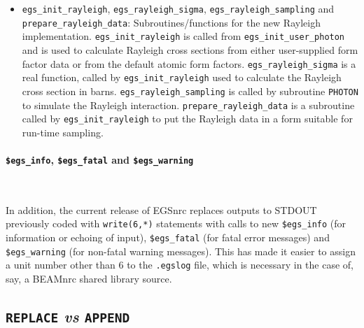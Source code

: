 \begin{itemize}
\item 
{}
{\tt egs\_init\_rayleigh}, {\tt egs\_rayleigh\_sigma},
{\tt egs\_rayleigh\_sampling} and {\tt prepare\_rayleigh\_data}:
Subroutines/functions for the new Rayleigh implementation. 
{\tt egs\_init\_rayleigh} is called from {\tt egs\_init\_user\_photon}
and is used to calculate Rayleigh cross sections from either user-supplied
form factor data or from the default atomic form factors.
{\tt egs\_rayleigh\_sigma} is a real function, called by
{\tt egs\_init\_rayleigh} used to calculate the Rayleigh cross
section in barns.  {\tt egs\_rayleigh\_sampling} is called by
subroutine {\tt PHOTON} to simulate the Rayleigh interaction.
{\tt prepare\_rayleigh\_data} is a subroutine called by
{\tt egs\_init\_rayleigh} to put the Rayleigh data in a form
suitable for run-time sampling. 

\end{itemize}

\paragraph{{\tt \$egs\_info}, {\tt \$egs\_fatal} and {\tt \$egs\_warning}}\hfill\\

In addition, the current release of EGSnrc replaces outputs to
STDOUT previously coded with {\tt write(6,*)} statements with 
calls to new {\tt \$egs\_info} (for information or echoing of input),
{\tt \$egs\_fatal} (for fatal error messages) and 
{\tt \$egs\_warning} (for non-fatal warning messages).  This has made it
easier to assign a unit number other than 6 to the {\tt .egslog} file, which
is necessary in the case of, say, a BEAMnrc shared library source. 
 
\subsection{{\tt REPLACE} {\it vs} {\tt APPEND}}
\label{append}

